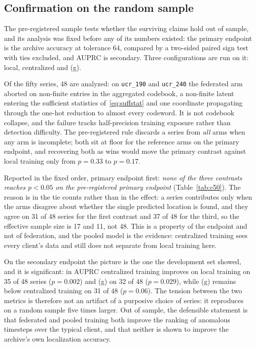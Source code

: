 \documentclass[conference]{IEEEtran}
\begin{document}
\subsection{Confirmation on the random sample}
\label{subsec:confirmation}

The pre-registered
sample tests whether the surviving claims hold out of sample, and its analysis was fixed before any
of its numbers existed: the primary endpoint is the archive accuracy at tolerance $64$, compared by
a two-sided paired sign test with ties excluded, and AUPRC is secondary. Three configurations are run
on it: local, centralized and (g).

Of the fifty series, 48 are analyzed: on \texttt{ucr\_190} and \texttt{ucr\_240} the federated arm
aborted on non-finite entries in the aggregated codebook, a non-finite latent entering the
sufficient statistics of~\eqref{eq:suffstat} and one coordinate propagating through the one-hot
reduction to almost every codeword. It is not codebook collapse, and the failure tracks
half-precision training exposure rather than detection difficulty. The pre-registered rule discards
a series from \emph{all} arms when any arm is incomplete; both sit at floor for the reference arms
on the primary endpoint, and recovering both as wins would move the primary contrast against local
training only from $p=0.33$ to $p=0.17$.

Reported in the fixed order, primary endpoint first: \emph{none of the three contrasts reaches
$p<0.05$ on the pre-registered primary endpoint} (Table~\ref{tab:c50}). The reason is in the tie
counts rather than in the effect: a series contributes only when the arms disagree about whether the
single predicted location is found, and they agree on 31 of 48 series for the first contrast and 37
of 48 for the third, so the effective sample size is 17 and 11, not 48. This is a property of the
endpoint and not of federation, and the pooled model is the evidence: centralized training sees
every client's data and still does not separate from local training here.

On the secondary endpoint the picture is the one the development set showed, and it is significant:
in AUPRC centralized training improves on local training on 35 of 48 series ($p=0.002$) and (g) on 32
of 48 ($p=0.029$), while (g) remains below centralized training on 31 of 48 ($p=0.06$). The tension
between the two metrics is therefore not an artifact of a purposive choice of series: it reproduces
on a random sample five times larger. Out of sample, the defensible statement is that federated and
pooled training both improve the ranking of anomalous timesteps over the typical client, and that
neither is shown to improve the archive's own localization accuracy.
\end{document}
